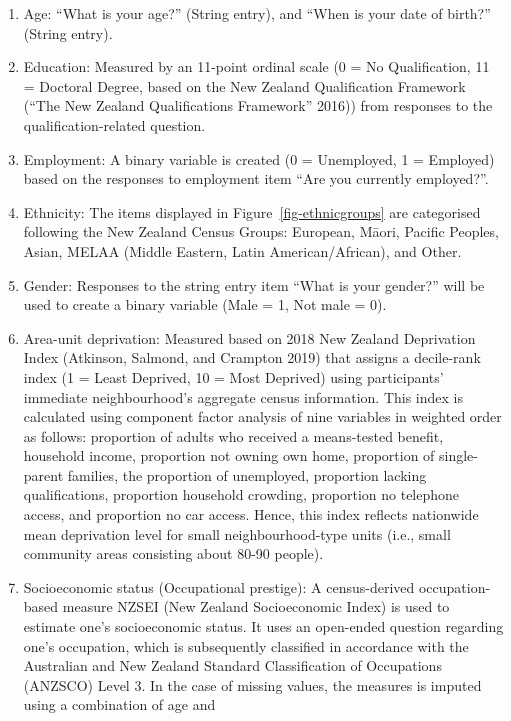 \documentclass[
]{interact}
\begin{document}
\begin{enumerate}
\def\labelenumi{\arabic{enumi}.}
\item
  Age: ``What is your age?'' (String entry), and ``When is your date of
  birth?'' (String entry).
\item
  Education: Measured by an 11-point ordinal scale (0 = No
  Qualification, 11 = Doctoral Degree, based on the New Zealand
  Qualification Framework ({``The New Zealand Qualifications
  Framework''} 2016)) from responses to the qualification-related
  question.
\item
  Employment: A binary variable is created (0 = Unemployed, 1 =
  Employed) based on the responses to employment item ``Are you
  currently employed?''.
\item
  Ethnicity: The items displayed in Figure~\ref{fig-ethnicgroups} are
  categorised following the New Zealand Census Groups: European, Māori,
  Pacific Peoples, Asian, MELAA (Middle Eastern, Latin
  American/African), and Other.
\item
  Gender: Responses to the string entry item ``What is your gender?''
  will be used to create a binary variable (Male = 1, Not male = 0).
\item
  Area-unit deprivation: Measured based on 2018 New Zealand Deprivation
  Index (Atkinson, Salmond, and Crampton 2019) that assigns a
  decile-rank index (1 = Least Deprived, 10 = Most Deprived) using
  participants' immediate neighbourhood's aggregate census information.
  This index is calculated using component factor analysis of nine
  variables in weighted order as follows: proportion of adults who
  received a means-tested benefit, household income, proportion not
  owning own home, proportion of single-parent families, the proportion
  of unemployed, proportion lacking qualifications, proportion household
  crowding, proportion no telephone access, and proportion no car
  access. Hence, this index reflects nationwide mean deprivation level
  for small neighbourhood-type units (i.e., small community areas
  consisting about 80-90 people).
\item
  Socioeconomic status (Occupational prestige): A census-derived
  occupation-based measure NZSEI (New Zealand Socioeconomic Index) is
  used to estimate one's socioeconomic status. It uses an open-ended
  question regarding one's occupation, which is subsequently classified
  in accordance with the Australian and New Zealand Standard
  Classification of Occupations (ANZSCO) Level 3. In the case of missing
  values, the measures is imputed using a combination of age and

\end{enumerate}
\end{document}
